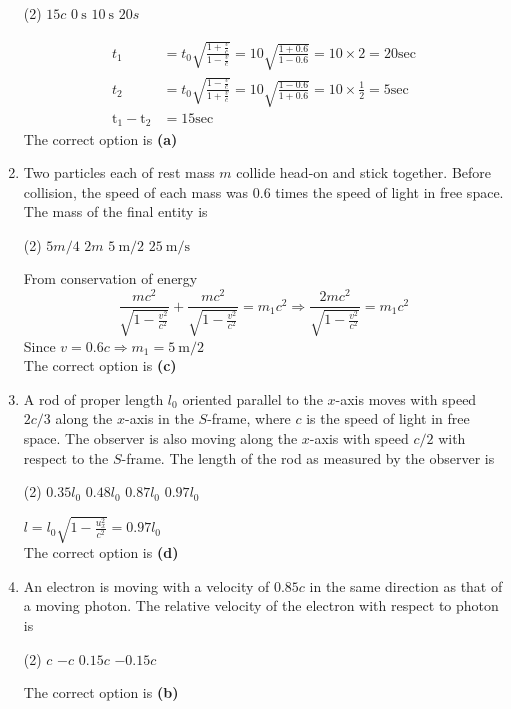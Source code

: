 \begin{enumerate}
\begin{tasks}(2)
	\task[\textbf{A.}] $15 c$
	\task[\textbf{B.}]$0 \mathrm{~s}$
	\task[\textbf{C.}] $10 \mathrm{~s}$
	\task[\textbf{D.}]$20 s$
\end{tasks}
\begin{answer}
\begin{align*}
t_{1}&=t_{0} \sqrt{\frac{1+\frac{v}{c}}{1-\frac{v}{c}}}=10 \sqrt{\frac{1+0.6}{1-0.6}}=10 \times 2=20 \mathrm{sec}\\
t_{2}&=t_{0} \sqrt{\frac{1-\frac{v}{c}}{1+\frac{v}{c}}}=10 \sqrt{\frac{1-0.6}{1+0.6}}=10 \times \frac{1}{2}=5 \mathrm{sec}\\
\mathrm{t}_{1}-\mathrm{t}_{2}&=15 \mathrm{sec}
\end{align*}	
The correct option is \textbf{(a)}
\end{answer}
	\item Two particles each of rest mass $m$ collide head-on and stick together. Before collision, the speed of each mass was $0.6$ times the speed of light in free space. The mass of the final entity is
{	}
\begin{tasks}(2)
	\task[\textbf{A.}] $5 m / 4$
	\task[\textbf{B.}]$2 m$
	\task[\textbf{C.}]$5 \mathrm{~m} / 2$
	\task[\textbf{D.}]$25 \mathrm{~m} / \mathrm{s}$
\end{tasks}
\begin{answer}
From conservation of energy\\
$$
\frac{m c^{2}}{\sqrt{1-\frac{v^{2}}{c^{2}}}}+\frac{m c^{2}}{\sqrt{1-\frac{v^{2}}{c^{2}}}}=m_{1} c^{2} \Rightarrow \frac{2 m c^{2}}{\sqrt{1-\frac{v^{2}}{c^{2}}}}=m_{1} c^{2}
$$
Since $v=0.6 c \Rightarrow m_{1}=5 \mathrm{~m} / 2$	\\
The correct option is \textbf{(c)}
\end{answer}
	\item A rod of proper length $l_{0}$ oriented parallel to the $x$-axis moves with speed $2 c / 3$ along the $x$-axis in the $S$-frame, where $c$ is the speed of light in free space. The observer is also moving along the $x$-axis with speed $c / 2$ with respect to the $S$-frame. The length of the rod as measured by the observer is
	{}
\begin{tasks}(2)
	\task[\textbf{A.}] $0.35 l_{0}$
	\task[\textbf{B.}]$0.48 l_{0}$
	\task[\textbf{C.}]$0.87 l_{0}$
	\task[\textbf{D.}]$0.97 l_{0}$
\end{tasks}
\begin{answer}
$l=l_{0} \sqrt{1-\frac{u_{x}^{2}}{c^{2}}}=0.97 l_{0}$\\
The correct option is \textbf{(d)}	
\end{answer}
	\item An electron is moving with a velocity of $0.85 c$ in the same direction as that of a moving photon. The relative velocity of the electron with respect to photon is
{	}
\begin{tasks}(2)
	\task[\textbf{A.}] $c$
	\task[\textbf{B.}]$-c$
	\task[\textbf{C.}] $0.15 c$
	\task[\textbf{D.}]$-0.15 c$
\end{tasks}
\begin{answer}
The correct option is \textbf{(b)}	
\end{answer}


\end{enumerate}
